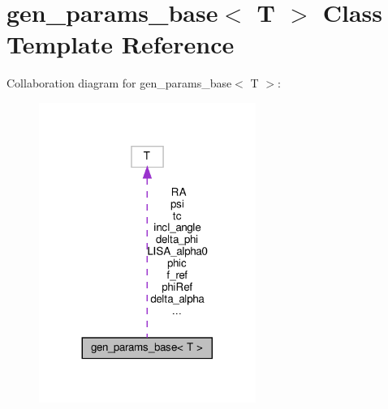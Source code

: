 \hypertarget{classgen__params__base}{}\section{gen\+\_\+params\+\_\+base$<$ T $>$ Class Template Reference}
\label{classgen__params__base}


Collaboration diagram for gen\+\_\+params\+\_\+base$<$ T $>$\+:\nopagebreak
\begin{figure}[H]
\begin{center}
\leavevmode
\includegraphics[width=200pt]{classgen__params__base__coll__graph}
\end{center}
\end{figure}

